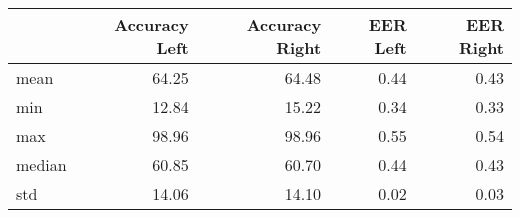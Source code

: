 \begin{tabular}{lrrrr}
\toprule
{} &  Accuracy Left &  Accuracy Right &  EER Left &  EER Right \\
\midrule
mean   &          64.25 &           64.48 &      0.44 &       0.43 \\
min    &          12.84 &           15.22 &      0.34 &       0.33 \\
max    &          98.96 &           98.96 &      0.55 &       0.54 \\
median &          60.85 &           60.70 &      0.44 &       0.43 \\
std    &          14.06 &           14.10 &      0.02 &       0.03 \\
\bottomrule
\end{tabular}
